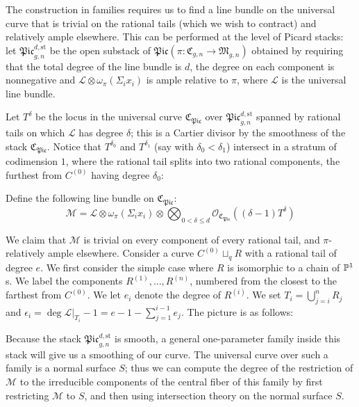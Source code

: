 The construction in families requires us to find a line bundle on the universal curve that is trivial on the rational tails (which we wish to contract) and relatively ample elsewhere. This can be performed at the level of Picard stacks: let $\mathfrak{Pic}_{g,n}^{d,\text{st}}$ be the open substack of $\mathfrak{Pic}(\pi\colon\mathfrak{C}_{g,n}\to\mathfrak{M}_{g,n})$ obtained by requiring that the total degree of the line bundle is $d$, the degree on each component is nonnegative and $\mathcal L\otimes\omega_{\pi}(\Sigma_i x_i)$ is ample relative to $\pi$, where $\mathcal L$ is the universal line bundle.

Let $T^{\delta}$ be the locus in the universal curve $\mathfrak{C}_{\mathfrak{Pic}}$ over $\mathfrak{Pic}_{g,n}^{d,\text{st}}$ spanned by rational tails on which $\mathcal L$ has degree $\delta$; this is a Cartier divisor by the smoothness of the stack $\mathfrak{C}_{\mathfrak{Pic}}$. Notice that $T^{\delta_0}$ and $T^{\delta_1}$ (say with $\delta_0<\delta_1$) intersect in a stratum of codimension $1$, where the rational tail splits into two rational components, the furthest from $C^{(0)}$ having degree $\delta_0$:

\begin{center}

\end{center}
\medskip

Define the following line bundle on $\mathfrak{C}_{\mathfrak{Pic}}$:
\begin{equation*} \mathcal M=\mathcal L\otimes\omega_{\pi}(\Sigma_i x_i)\otimes\bigotimes_{0<\delta\leq d}\mathcal O_{\mathfrak{C}_{\mathfrak{Pic}}}((\delta-1) T^\delta) \end{equation*}

We claim that $\mathcal{M}$ is trivial on every component of every rational tail, and $\pi$-relatively ample elsewhere. Consider a curve $C^{(0)}\sqcup_q R$ with a rational tail of degree $e$. We first consider the simple case where $R$ is isomorphic to a chain of $\mathbb P^1$s. We label the components $R^{(1)},\ldots,R^{(n)}$, numbered from the closest to the farthest from $C^{(0)}$. We let $e_i$ denote the degree of $R^{(i)}$. We set $T_i=\bigcup_{j=i}^n R_j$ and $\epsilon_i=\deg \mathcal{L}|_{T_i} - 1 = e-1-\sum_{j=1}^{i-1} e_j$. The picture is as follows:

\begin{center}

\end{center}

Because the stack $\mathfrak{Pic}_{g,n}^{d,\text{st}}$ is smooth, a general one-parameter family inside this stack will give us a smoothing of our curve. The universal curve over such a family is a normal surface $S$; thus we can compute the degree of the restriction of $\mathcal M$ to the irreducible components of the central fiber of this family by first restricting $\mathcal M$ to $S$, and then using intersection theory on the normal surface $S$.


